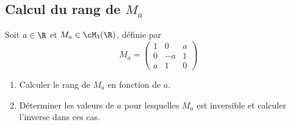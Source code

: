 \subsection{Calcul du rang de $M_a$}

\begin{exercice}
Soit $a\in \R$ et  $M_a \in\cM_3(\R) $, définie par 
$$ M_a =\left( 
\begin{array}{ccc}
1 & 0 & a\\
0 & -a & 1\\
a & 1 & 0
\end{array}
\right)$$
\begin{enumerate}
\item  Calculer le rang de $M_a$ en fonction de $a$. 
\item Déterminer les valeurs de $a$ pour lesquelles $M_a$ est inversible et calculer l'inverse dans ces cas. 
\end{enumerate}


\end{exercice}
